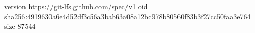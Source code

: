 version https://git-lfs.github.com/spec/v1
oid sha256:4919630a6e4d52df3c56a3bab63a08a12bc978b80560f83b3f27cc50faa3e764
size 87544

